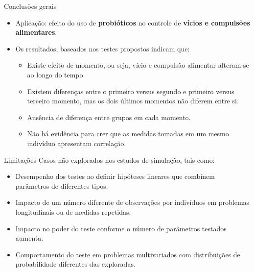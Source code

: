 \documentclass[
  ignorenonframetext,
  serif,
  professionalfont,
  usenames,
  dvipsnames,
  aspectratio = 169]{beamer}
\begin{document}
\begin{frame}{Conclusões gerais}
\protect\hypertarget{conclusuxf5es-gerais-1}{}
\begin{itemize}
  \itemsep 2ex
  
  \item Aplicação: efeito do uso de \textbf{probióticos} no controle de \textbf{vícios e compulsões alimentares}.

  \item Os resultados, baseados nos testes propostos indicam que: 
  \begin{itemize}
    \item Existe efeito de momento, ou seja, vício e compulsão alimentar alteram-se ao longo do tempo.
    \item Existem diferenças entre o primeiro versus segundo e primeiro versus terceiro momento, mas os dois últimos momentos não diferem entre si.
    \item Ausência de diferença entre grupos em cada momento.
    \item Não há evidência para crer que as medidas tomadas em um mesmo indivíduo apresentam correlação.
  \end{itemize}
\end{itemize}
\end{frame}

\begin{frame}{Limitações}
\protect\hypertarget{limitauxe7uxf5es}{}
Casos não explorados nos estudos de simulação, tais como:

\begin{itemize}
  \itemsep 2ex
  
  \item Desempenho dos testes ao definir hipóteses lineares que combinem parâmetros de diferentes tipos.
  \item Impacto de um número diferente de observações por indivíduos em problemas longitudinais ou de medidas repetidas. 
  \item Impacto no poder do teste conforme o número de parâmetros testados aumenta.
  \item Comportamento do teste em problemas multivariados com distribuições de probabilidade diferentes das exploradas.

\end{itemize}
\end{frame}
\end{document}
